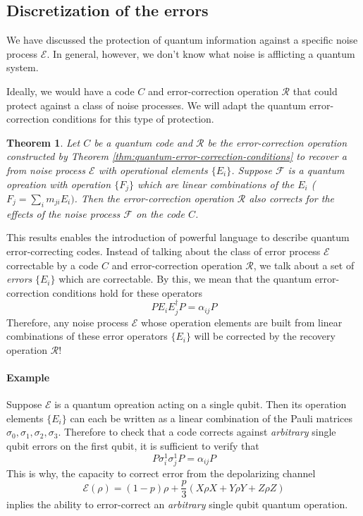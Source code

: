 \documentclass[11pt,a4paper]{article}
\theoremstyle{definition}
\theoremstyle{plain}
\newtheorem{theorem}[definition]{Theorem}
\theoremstyle{remark}
\begin{document}
\subsection{Discretization of the errors}
We have discussed the protection of quantum information against a specific noise process $\mathcal{E}$. In general, however, 
we don't know what noise is afflicting a quantum system. 

Ideally, we would have a code $C$ and error-correction operation $\mathcal{R}$ that could protect against a class of 
noise processes. We will adapt the quantum error-correction conditions for this type of protection. 

\begin{theorem}
Let $C$ be a quantum code and $\mathcal{R}$ be the error-correction operation constructed by Theorem \ref{thm:quantum-error-correction-conditions}
to recover a from noise process $\mathcal{E}$ with operational elements $\{E_i\}$. Suppose $\mathcal{F}$ is a quantum opreation with operation $\{F_j\}$ which 
are \emph{linear combinations} of the $E_i$ ($F_j = \sum_i m_{ji} E_i)$.  Then the error-correction operation $\mathcal{R}$ also corrects for the effects of the noise 
process $\mathcal{F}$ on the code $C$. 
\end{theorem}
This results enables the introduction of powerful language to describe quantum error-correcting codes. Instead of talking about 
the class of error process $\mathcal{E}$ correctable by a code $C$ and error-correction operation $\mathcal{R}$, we talk about a set of \emph{errors} $\{E_i\}$ which are correctable.
By this, we mean that the quantum error-correction conditions hold for these operators 
$$P E_i E_j^\dagger P = \alpha_{ij} P$$
Therefore, any noise process $\mathcal{E}$ whose operation elements are built from linear combinations of these error operators $\{E_i\}$ will be corrected 
by the recovery operation $\mathcal{R}$! 

\paragraph{Example} 
Suppose $\mathcal{E}$ is a quantum opreation acting on a single qubit. Then its operation elements $\{E_i\}$ can each be written as a linear 
combination of the Pauli matrices $\sigma_0, \sigma_1, \sigma_2, \sigma_3$. Therefore to check that a code corrects against \emph{arbitrary} single 
qubit errors on the first qubit, it is sufficient to verify that
$$P \sigma_i^1 \sigma_j^1 P = \alpha_{ij} P$$
This is why, the capacity to correct error from the depolarizing channel 
$$\mathcal{E}(\rho) = (1-p) \rho + \frac{p}{3} (X \rho X + Y \rho Y + Z \rho Z)$$
inplies the ability to error-correct an \emph{arbitrary} single qubit quantum operation. 
\end{document}

